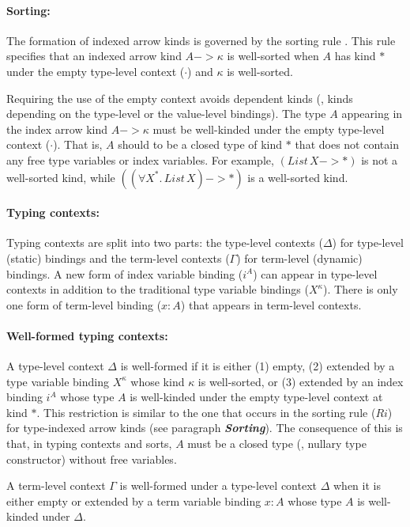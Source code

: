 \paragraph{Sorting:} \label{sorting}
The formation of indexed arrow kinds is
governed by the sorting rule . This rule specifies that
an indexed arrow kind $A -> \kappa$ is well-sorted when $A$ has kind $*$
under the empty type-level context ($\cdot$) and $\kappa$ is well-sorted.

Requiring the use of the empty context avoids dependent kinds (\ie, kinds depending on the type-level or the value-level
bindings). The type $A$ appearing in
the index arrow kind $A -> \kappa$ must be well-kinded under
the empty type-level context ($\cdot$).
That is, $A$ should to be a closed type of kind $*$
that does not contain any free type variables or index variables.
For example, $(\textit{List}\,X -> *)$ is not a well-sorted kind,
while $((\forall X^{*}\!.\,\textit{List}\,X) -> *)$ is a well-sorted kind.

\paragraph{Typing contexts:}
Typing contexts are split into two parts:
the type-level contexts ($\Delta$) for type-level (static) bindings
and the term-level contexts ($\Gamma$) for term-level (dynamic) bindings.
A new form of index variable binding ($i^A$) can appear in
type-level contexts in addition to the traditional type variable bindings ($X^\kappa$).
There is only one form of term-level binding ($x:A$) that appears in
term-level contexts.

\paragraph{Well-formed typing contexts:}
A type-level context $\Delta$ is well-formed if it is either (1) empty,
(2) extended by a type variable binding $X^\kappa$ whose kind $\kappa$ is
well-sorted, or (3) extended by an index binding $i^A$ whose type $A$ is
well-kinded under the empty type-level context at kind $*$.
This restriction is similar to the one that occurs in the sorting rule ($Ri$)
for type-indexed arrow kinds (see paragraph {\bf\textit{Sorting}}).
The consequence of this is that, in typing contexts and sorts, $A$ must be
a closed type (\ie, nullary type constructor) without free variables.

A term-level context $\Gamma$ is well-formed under a type-level context
$\Delta$ when it is either empty or extended by a term variable binding
$x:A$ whose type $A$ is well-kinded under $\Delta$.



